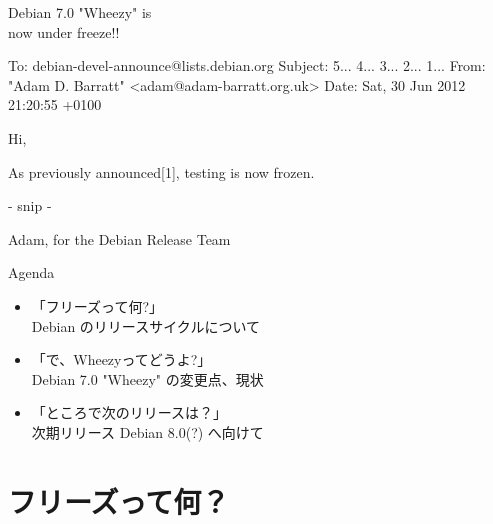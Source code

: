 \documentclass[cjk,dvipdfmx,12pt,compress,%
hyperref={bookmarks=true,bookmarksnumbered=true,bookmarksopen=false,%
  colorlinks=false,%
  pdftitle={第 66 回 関西 Debian 勉強会@KOF2012},%
  pdfauthor={佐々木洋平},%
  pdfsubject={資料},%
}]{beamer}
\begin{document}
\begin{frame}[containsverbatim]{Debian 7.0 "Wheezy" is \\ \hspace{5.5ex} now under freeze!!}

  \begin{commandline}

To: debian-devel-announce@lists.debian.org
Subject: 5... 4... 3... 2... 1...
From: "Adam D. Barratt" <adam@adam-barratt.org.uk>
Date: Sat, 30 Jun 2012 21:20:55 +0100

Hi,

As previously announced[1], testing is now frozen.

- snip -

Adam,
for the Debian Release Team

\end{commandline}

\end{frame}


\begin{frame}{Agenda}
  \begin{itemize}
  \item<2-> {\color{red}「フリーズって何?」 \\
      Debian のリリースサイクルについて}
  \item  「で、Wheezyってどうよ?」\\
    Debian 7.0 "Wheezy" の変更点、現状
  \item 「ところで次のリリースは？」\\
    次期リリース Debian 8.0(?) へ向けて
  \end{itemize}
\end{frame}

\section{フリーズって何？}



\settitleslide
{}
\begin{frame}\end{frame}
\setdefaultslide
\end{document}
